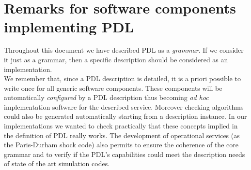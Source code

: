\documentclass[a4paper,11pt] {ivoa}
\begin{document}
\section{Remarks for software components implementing PDL}
Throughout this document we have described PDL as a {\it grammar}. 
If we consider it just as a grammar, then a specific description should be considered as an implementation.\\ 
We remember that, since a PDL description is detailed, it is {a priori} possible to write once for all generic software components. These components will be automatically {\it configured} by a PDL description thus becoming {\it ad hoc} implementation software for the described service. Moreover checking algorithms could also be generated automatically starting from a description instance.
In our implementations we wanted to check practically that these concepts implied in the definition of PDL really works. 
The development of operational services (as the Paris-Durham shock code) also permits to ensure the coherence of the core grammar and to verify if the PDL's capabilities could meet the description needs of state of the art simulation codes.
\end{document}
